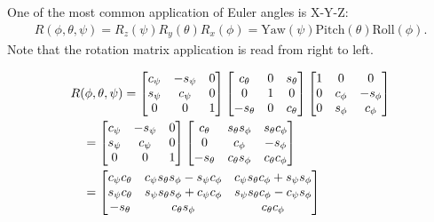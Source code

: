 \documentclass{article}
\begin{document}
One of the most  common application  of Euler angles is X-Y-Z:
\begin{align}
  R(\phi, \theta, \psi) = R_z(\psi)R_y(\theta)R_x(\phi) = \text{Yaw}(\psi)\text{Pitch}(\theta)\text{Roll}(\phi).
\end{align}
Note that the rotation matrix  application is read  from right  to  left.

\begin{align}
  &R(\phi, \theta, \psi) =  \begin{bmatrix}
  c_\psi & - s_\psi & 0 \\
  s_\psi & c_\psi & 0 \\
  0 & 0 & 1
  \end{bmatrix}
  \begin{bmatrix}
    c_\theta & 0 & s_\theta \\
    0 & 1 & 0 \\
    - s_\theta & 0 & c_\theta
    \end{bmatrix}
    \begin{bmatrix}
      1 & 0 & 0 \\
      0 & c_\phi & - s_\phi \\
      0 & s_\phi & c_\phi
      \end{bmatrix}
\notag\\&\quad
  =\begin{bmatrix}
    c_\psi & - s_\psi & 0 \\
    s_\psi & c_\psi & 0 \\
    0 & 0 & 1
  \end{bmatrix}
            \begin{bmatrix}
              c_\theta & s_\theta s_\phi & s_\theta c_\phi \\
              0 & c_\phi & -s_\phi \\
              -s_\theta & c_\theta s_\phi & c_\theta c_\phi
            \end{bmatrix}
\notag\\&\quad
  = \begin{bmatrix}
    c_\psi c_\theta & c_\psi s_\theta s_\phi - s_\psi c_\phi & c_\psi s_\theta c_\phi+ s_\psi s_\phi \\
    s_\psi c_\theta & s_\psi s_\theta s_\phi + c_\psi c_\phi & s_\psi s_\theta c_\phi - c_\psi s_\phi \\
    -s_\theta & c_\theta s_\phi & c_\theta c_\phi
    \end{bmatrix}
\end{align}
\end{document}
